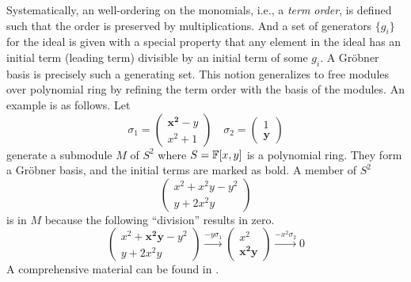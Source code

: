 Systematically, an well-ordering on the monomials, i.e., a \emph{term order}, is defined
such that the order is preserved by multiplications.
And a set of generators $\{ g_i \}$ for the ideal is given with a special property 
that any element in the ideal has an initial term (leading term)
divisible by an initial term of some $g_i$.
A Gr\"obner basis is precisely such a generating set.
This notion generalizes to free modules over polynomial ring by refining the term order with the basis of the modules.
An example is as follows. Let
\[
 \sigma_1 = 
 \begin{pmatrix}
  \mathbf{x^2} - y \\
  x^2 + 1
 \end{pmatrix} \quad
 \sigma_2 = 
 \begin{pmatrix}
  1 \\
  \mathbf{y}
 \end{pmatrix}
\]
generate a submodule $M$ of $S^2$ where $S = \mathbb{F}[x,y]$ is a polynomial ring.
They form a Gr\"obner basis, and the initial terms are marked as bold.
A member of $S^2$
\[
 \begin{pmatrix}
 x^2 + x^2 y - y^2 \\
 y+2 x^2 y
 \end{pmatrix}
\]
is in $M$ because the following ``division'' results in zero.
\[
  \begin{pmatrix}
 x^2+\mathbf{x^2 y}-y^2 \\
 y+2 x^2 y
 \end{pmatrix}
 \xrightarrow{-y \sigma_1}
 \begin{pmatrix}
 x^2 \\
 \mathbf{x^2 y}
 \end{pmatrix}
 \xrightarrow{-x^2 \sigma_2} 0
\]
A comprehensive material can be found in \cite[Chapter~15]{Eisenbud}.


